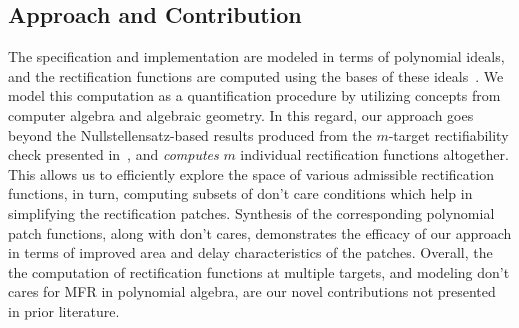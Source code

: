 {\red 

}

\subsection{Approach and Contribution}
The specification and implementation are modeled in terms of polynomial ideals, and
the rectification functions are computed using the \Grobner bases of these ideals~\cite{gb_book}.
We model this computation as a quantification procedure by utilizing
concepts from computer algebra and algebraic geometry. 
In this regard, our approach goes beyond
the Nullstellensatz-based results produced from the $m$-target
rectifiability check presented in~\cite{Vkrao:ISQED21}, and {\it computes}
$m$ individual rectification functions altogether. This allows us to
efficiently explore the space of various admissible rectification
functions, in turn, computing subsets of don't care conditions
which help in simplifying the rectification patches. Synthesis of the 
corresponding polynomial patch functions, along with don't cares,  
demonstrates the efficacy of our approach in terms of improved area 
and delay characteristics of the patches.
Overall, the  the computation of rectification functions at multiple
targets, and modeling don't cares for MFR in
polynomial algebra, are our novel contributions not presented
in prior literature. 




